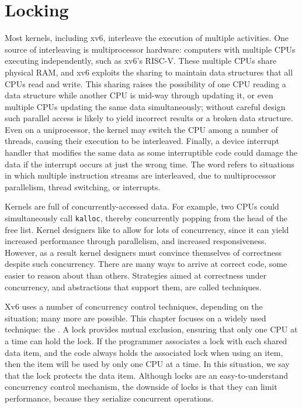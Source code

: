 \chapter{Locking}
\label{CH:LOCK}

Most kernels, including xv6, interleave the execution
of multiple activities.
One source of interleaving is multiprocessor hardware:
computers with
multiple CPUs executing independently, such as xv6's RISC-V.
These multiple CPUs share physical RAM,
and xv6 exploits the sharing to maintain
data structures that all CPUs read and write.
This sharing raises the possibility of
one CPU reading a data structure while another
CPU is mid-way through updating it, or even
multiple CPUs updating the same data simultaneously;
without careful design such parallel access is likely
to yield incorrect results or a broken data structure.
Even on a uniprocessor, the kernel may switch the CPU among
a number of threads, causing their execution to be interleaved.
Finally, a device interrupt handler that modifies
the same data as some interruptible code could damage
the data if the interrupt occurs at just the wrong time.
The word 
refers to situations in which
multiple instruction streams are interleaved,
due to multiprocessor parallelism,
thread switching, or interrupts.

Kernels are full of concurrently-accessed data. For example, two CPUs
could simultaneously call {\tt kalloc}, thereby concurrently
popping from the head of the free list. Kernel designers like to allow
for lots of concurrency, since it can yield increased performance
through parallelism, and increased responsiveness. However, as a result
kernel designers must convince themselves of
correctness despite such concurrency. There are many ways to arrive at
correct code, some easier to reason about than others. Strategies
aimed at correctness under concurrency, and abstractions that support
them, are called  techniques.

Xv6 uses a number of concurrency control techniques, depending on the
situation; many more are possible. This chapter focuses on a widely
used technique: the .  A lock provides mutual
exclusion, ensuring that only one CPU at a time can hold the lock. If
the programmer associates a lock with each shared data item, and the
code always holds the associated lock when using an item, then the
item will be used by only one CPU at a time.  In this situation, we
say that the lock protects the data item.  Although locks are an
easy-to-understand concurrency control mechanism, the downside of
locks is that they can limit performance, because they serialize
concurrent operations.

